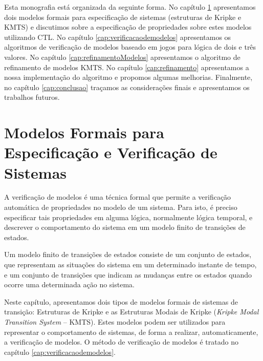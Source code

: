\documentclass[normaltoc,capchap,capsec,times]{abnt}
\begin{document}
Esta monografia está organizada da seguinte forma. No capítulo \ref{cap:modelosformais} apresentamos dois modelos formais para especificação de sistemas (estruturas de Kripke e KMTS) e discutimos sobre a especificação de propriedades sobre estes modelos utilizando CTL. No capítulo \ref{cap:verificacaodemodelos} apresentamos os algoritmos de verificação de modelos baseado em jogos para lógica de dois e três valores. No capítulo \ref{cap:refinamentoModelos} apresentamos o algoritmo de refinamento de modelos KMTS. No capítulo \ref{cap:refinamento} apresentamos a nossa implementação do algoritmo e propomos algumas melhorias. Finalmente, no capítulo \ref{cap:conclusao} traçamos as considerações finais e apresentamos os trabalhos futuros.


\chapter{Modelos Formais para Especificação e Verificação de Sistemas}\label{cap:modelosformais}

A verificação de modelos é uma técnica formal que permite a verificação automática de propriedades no modelo de um sistema. Para isto, é preciso especificar tais propriedades em alguma lógica, normalmente lógica temporal, e descrever o comportamento do sistema em um modelo finito de transições de estados.

Um modelo finito de transições de estados consiste de um conjunto de estados, que representam as situações do sistema em um determinado instante de tempo, e um conjunto de transições que indicam as mudanças entre os estados quando ocorre uma determinada ação no sistema. 


Neste capítulo, apresentamos dois tipos de modelos formais de sistemas de transição: Estruturas de Kripke e as Estruturas Modais de Kripke (\textit{Kripke Modal Transition System} -- KMTS). Estes modelos podem ser utilizados para representar o comportamento de sistemas, de forma a realizar, automaticamente, a verificação de modelos. O método de verificação de modelos é tratado no capítulo \ref{cap:verificacaodemodelos}.   
\end{document}

